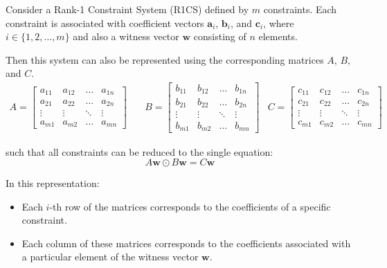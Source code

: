 \documentclass[../lecture-notes.tex]{subfiles}
\begin{document}
\begin{theorem} 
    Consider a Rank-1 Constraint System (R1CS) defined by $m$ constraints. Each constraint is
    associated with coefficient vectors $\mathbf{a}_i$, $\mathbf{b}_i$, and $\mathbf{c}_i$, where $i \in \{1, 2, \dots, m\}$ and
    also a witness vector $\mathbf{w}$ consisting of $n$ elements.

    Then this system can also be represented using the corresponding matrices $A$, $B$, and $C$.
    \begin{align*}
        A = \begin{bmatrix}
            a_{11} & a_{12} & \dots & a_{1n} \\
            a_{21} & a_{22} & \dots & a_{2n} \\
            \vdots & \vdots & \ddots & \vdots \\
            a_{m1} & a_{m2} & \dots & a_{mn}
        \end{bmatrix} & \quad
        B = \begin{bmatrix}
            b_{11} & b_{12} & \dots & b_{1n} \\
            b_{21} & b_{22} & \dots & b_{2n} \\
            \vdots & \vdots & \ddots & \vdots \\
            b_{m1} & b_{m2} & \dots & b_{mn}
        \end{bmatrix} & 
        C = \begin{bmatrix}
            c_{11} & c_{12} & \dots & c_{1n} \\
            c_{21} & c_{22} & \dots & c_{2n} \\
            \vdots & \vdots & \ddots & \vdots \\
            c_{m1} & c_{m2} & \dots & c_{mn}
        \end{bmatrix}
    \end{align*}

    such that all constraints can be reduced to the single equation:
    \begin{equation*}
        A\mathbf{w} \odot B\mathbf{w} = C\mathbf{w}
    \end{equation*}
    
    In this representation:
    \begin{itemize}
        \item Each $i$-th row of the matrices corresponds to the coefficients of a specific constraint.
        \item Each column of these matrices corresponds to the coefficients associated with a 
        particular element of the witness vector $\mathbf{w}$.
    \end{itemize}
\end{theorem}
\end{document}
